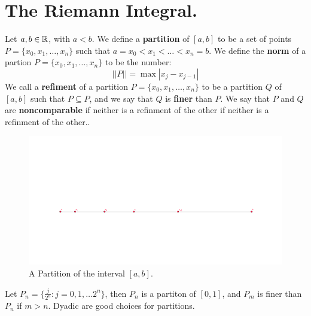 

\section{The Riemann Integral.}

\begin{definition}
    Let $a,b \in \mathbb{R}$, with  $a<b$. We define a  \textbf{partition} of $[a,b]$ to be a set of points $P=\{x_0,x_1, \dots, x_n\}$ such that $a=x_0<x_1< \dots <x_n=b$.
    We define the \textbf{norm} of a partion $P=\{x_0,x_1, \dots, x_n\}$ to be the number:
    \begin{equation}
        ||P||=\max|x_j-x_{j-1}|
    \end{equation} 
    We call a \textbf{refiment} of a partition $P=\{x_0,x_1, \dots, x_n\}$ to be a partition $Q$ of  $[a,b]$ such that  $P \subseteq P$, and we say that $Q$ is  \textbf{finer} than $P$. We say that $P$ and  $Q$ are  \textbf{noncomparable} if neither is a refinment of the other if neither is a refinment of the other..
\end{definition}

\begin{figure}	
    \centering
    \includegraphics[scale = 0.3]{figures/partitionOfAnInterval.png}
    \caption{A Partition of the interval $[a,b]$.}
    \label{fig_5.1}
\end{figure}

\begin{example}
    Let $P_n=\{\frac{j}{2^n}: j=0,1, \dots 2^n\}$, then $P_n$ is a partiton of  $[0,1]$, and  $P_m$ is finer than  $P_n$ if  $m>n$.
    Dyadic are good choices for partitions.
\end{example} 

